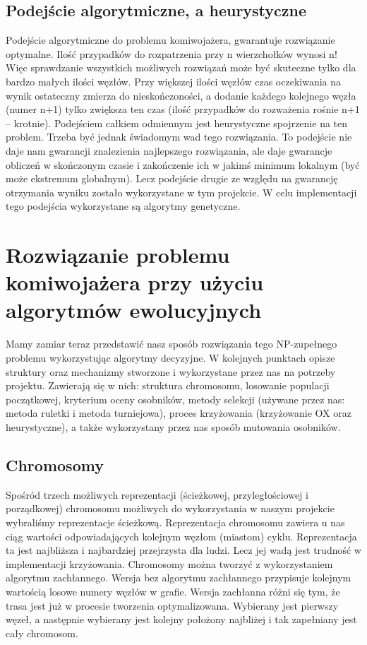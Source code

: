 \documentclass[a4paper]{article}
\begin{document}
\subsection{Podejście algorytmiczne, a heurystyczne}
Podejście algorytmiczne do problemu komiwojażera, gwarantuje rozwiązanie optymalne. Ilość przypadków do rozpatrzenia przy n wierzchołków wynosi n! Więc sprawdzanie wszystkich możliwych rozwiązań może być skuteczne tylko dla bardzo małych ilości węzłów. Przy większej ilości węzłów czas oczekiwania na wynik ostateczny zmierza do nieskończoności, a dodanie każdego kolejnego węzła (numer n+1) tylko zwiększa ten czas (ilość przypadków do rozważenia rośnie n+1 – krotnie).  Podejściem całkiem odmiennym jest heurystyczne spojrzenie na ten problem. Trzeba być jednak świadomym wad tego rozwiązania. To podejście nie daje nam gwarancji znalezienia najlepszego rozwiązania, ale daje gwarancje obliczeń w skończonym czasie i zakończenie ich w jakimś minimum lokalnym (być może ekstremum globalnym). Lecz podejście drugie ze względu na gwarancję otrzymania wyniku zostało wykorzystane w tym projekcie. W celu implementacji tego podejścia wykorzystane są algorytmy genetyczne.

\section{Rozwiązanie problemu komiwojażera przy użyciu algorytmów ewolucyjnych}
Mamy zamiar teraz przedstawić nasz sposób rozwiązania tego NP-zupełnego problemu wykorzystując algorytmy decyzyjne. W kolejnych punktach opisze struktury oraz mechanizmy stworzone i wykorzystane przez nas na potrzeby projektu. Zawierają się w nich: struktura chromosomu, losowanie populacji początkowej, kryterium oceny osobników, metody selekcji (używane przez nas: metoda ruletki i metoda turniejowa), proces krzyżowania (krzyżowanie OX oraz heurystyczne), a także wykorzystany przez nas sposób mutowania osobników.

\subsection{Chromosomy}
Spośród trzech możliwych reprezentacji (ścieżkowej, przyległościowej i porządkowej) chromosomu możliwych do wykorzystania w naszym projekcie wybraliśmy reprezentacje ścieżkową. Reprezentacja chromosomu zawiera u nas ciąg wartości odpowiadających kolejnym węzłom (miastom) cyklu. Reprezentacja ta jest najbliższa i najbardziej przejrzysta dla ludzi. Lecz jej wadą jest trudność w implementacji krzyżowania. Chromosomy można tworzyć z wykorzystaniem algorytmu zachłannego. Wersja bez algorytmu zachłannego przypisuje kolejnym wartością losowe numery węzłów w grafie. Wersja zachłanna różni się tym, że trasa jest już w procesie tworzenia optymalizowana. Wybierany jest pierwszy węzeł, a następnie wybierany jest kolejny położony najbliżej i tak zapełniany jest cały chromosom.
\end{document}
